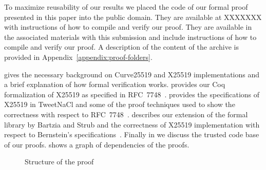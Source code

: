 

To maximize reusability of our results we placed the code of our formal proof
presented in this paper into the public domain.
\ifpublic
They are available at XXXXXXX
with instructions of how to compile and verify our proof.
\else
They are available in the associated materials with this submission 
and include instructions of how to compile and verify our proof.
\fi
A description of the content of the archive is provided in
Appendix~\ref{appendix:proof-folders}.

 gives the necessary background on Curve25519 and X25519
implementations and a brief explanation of how formal verification works.
 provides our Coq formalization of X25519 as specified in RFC~7748~\cite{rfc7748}.
 provides the specifications of X25519 in TweetNaCl and some of the
proof techniques used to show the correctness with respect to RFC~7748~\cite{rfc7748}.
 describes our extension of the formal library by Bartzia
and Strub and the correctness of X25519 implementation with respect to Bernstein's
specifications~\cite{Ber14}.
Finally in  we discuss the trusted code base of our proofs.
 shows a graph of dependencies of the proofs.

\begin{figure}[h]
  \centering
  
  \caption{Structure of the proof}
  \label{tikz:ProofOverview}
\end{figure}



